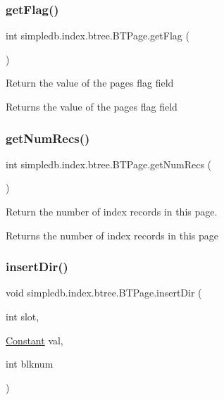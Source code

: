 \subsubsection{\texorpdfstring{get\+Flag()}{getFlag()}}
{\footnotesize\ttfamily int simpledb.\+index.\+btree.\+B\+T\+Page.\+get\+Flag (\begin{DoxyParamCaption}{ }\end{DoxyParamCaption})\hspace{0.3cm}{\ttfamily [inline]}}

Return the value of the page\textquotesingle{}s flag field \begin{DoxyReturn}{Returns}
the value of the page\textquotesingle{}s flag field 
\end{DoxyReturn}
\mbox{\label{classsimpledb_1_1index_1_1btree_1_1BTPage_aba2b632141026a579a0066aca2302b0a}} 
\subsubsection{\texorpdfstring{get\+Num\+Recs()}{getNumRecs()}}
{\footnotesize\ttfamily int simpledb.\+index.\+btree.\+B\+T\+Page.\+get\+Num\+Recs (\begin{DoxyParamCaption}{ }\end{DoxyParamCaption})\hspace{0.3cm}{\ttfamily [inline]}}

Return the number of index records in this page. \begin{DoxyReturn}{Returns}
the number of index records in this page 
\end{DoxyReturn}
\mbox{\label{classsimpledb_1_1index_1_1btree_1_1BTPage_a0ea20d043ba60421c1e2b242b56f4986}} 
\subsubsection{\texorpdfstring{insert\+Dir()}{insertDir()}}
{\footnotesize\ttfamily void simpledb.\+index.\+btree.\+B\+T\+Page.\+insert\+Dir (\begin{DoxyParamCaption}\item[{int}]{slot,  }\item[{\hyperlink{classsimpledb_1_1query_1_1Constant}{Constant}}]{val,  }\item[{int}]{blknum }\end{DoxyParamCaption})\hspace{0.3cm}{\ttfamily [inline]}}

